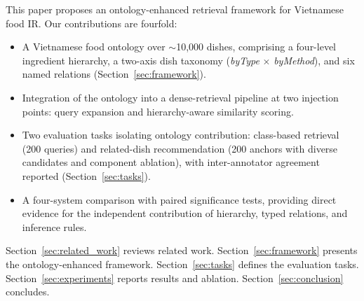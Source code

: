 This paper proposes an ontology-enhanced retrieval framework for Vietnamese food IR. Our contributions are fourfold:
\begin{itemize}
  \item A Vietnamese food ontology over ${\sim}$10{,}000 dishes, comprising a four-level ingredient hierarchy, a two-axis dish taxonomy (\emph{byType} $\times$ \emph{byMethod}), and six named relations (Section~\ref{sec:framework}).
    \item Integration of the ontology into a dense-retrieval pipeline at two injection points: query expansion and hierarchy-aware similarity scoring.

    \item Two evaluation tasks isolating ontology contribution: class-based retrieval (200 queries) and related-dish recommendation (200 anchors with diverse candidates and component ablation), with inter-annotator agreement reported (Section~\ref{sec:tasks}).

  \item A four-system comparison with paired significance tests, providing direct evidence for the independent contribution of hierarchy, typed relations, and inference rules.
\end{itemize}

Section~\ref{sec:related_work} reviews related work. Section~\ref{sec:framework} presents the ontology-enhanced framework. Section~\ref{sec:tasks} defines the evaluation tasks. Section~\ref{sec:experiments} reports results and ablation. Section~\ref{sec:conclusion} concludes.
